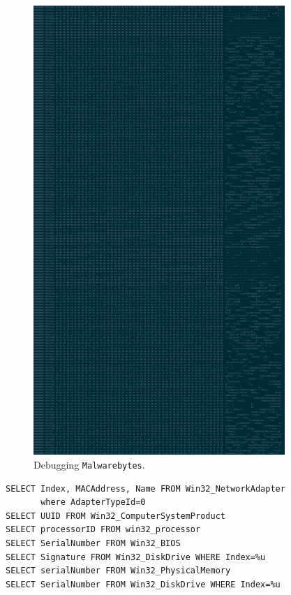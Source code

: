 \begin{figure}
  \centering
  \includegraphics[width=0.85\textwidth]{./figures/Debug2}
  \caption{\label{fig:malwarebytes-debug} Debugging \texttt{Malwarebytes}.}
\end{figure}

\begin{tcolorbox}
  \small
\begin{verbatim}
SELECT Index, MACAddress, Name FROM Win32_NetworkAdapter 
       where AdapterTypeId=0
SELECT UUID FROM Win32_ComputerSystemProduct
SELECT processorID FROM win32_processor
SELECT SerialNumber FROM Win32_BIOS
SELECT Signature FROM Win32_DiskDrive WHERE Index=%u
SELECT serialNumber FROM Win32_PhysicalMemory
SELECT SerialNumber FROM Win32_DiskDrive WHERE Index=%u
\end{verbatim}
\end{tcolorbox}

